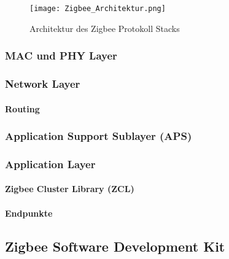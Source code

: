 \begin{figure}[h]
	\centering
	\texttt{[image: Zigbee\_Architektur.png]}
	\caption{Architektur des Zigbee Protokoll Stacks \cite{markus_krause_rainer_konrad_drahtlose_2014}}
	\label{fig:ArchitekturdesZigbeeProtokollStacks}
\end{figure}

\subsubsection{MAC und PHY Layer}\label{subsubsec:MACundPHYLayer}

\subsubsection{Network Layer}\label{subsubsec:Network Layer}

\paragraph{Routing}\label{par:Zigbee Routing}






\subsubsection{Application Support Sublayer (APS)}\label{subsubsec:ApplicationSupportSublayer}


\subsubsection{Application Layer}\label{subsubsec:ZigbeeApplicationLayer}

\paragraph{Zigbee Cluster Library (ZCL)}\label{par:ZigbeeClusterLibrary}

\paragraph{Endpunkte}\label{par:ZigbeeEndpunkte}





\subsection{Zigbee Software Development Kit}\label{subsec:ZigbeeSoftwareDevelopmentKit}
